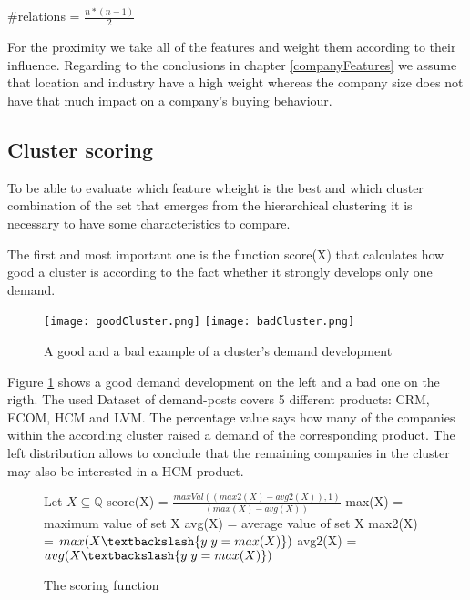 \begin{center}
  { \Large #relations \LARGE = $\frac{n*(n-1)}{2}$}
\end{center}

For the proximity we take all of the features and weight them according to their influence. Regarding to the conclusions in chapter
\ref{companyFeatures} we assume that location and industry have a high weight whereas the company size does not have that much impact
on a company's buying behaviour.


\subsection{Cluster scoring}

To be able to evaluate which feature wheight is the best and which cluster combination of the set that emerges from the hierarchical
clustering it is necessary to have some characteristics to compare.

The first and most important one is the function score(X) that calculates how good a cluster is according to the fact whether
it strongly develops only one demand.

\begin{figure}[ht]
\texttt{[image: goodCluster.png]}
\texttt{[image: badCluster.png]}
\centering
\caption{A good and a bad example of a cluster's demand development}
\label{fig:clusterDemandDevelopment}
\end{figure}

Figure \ref{fig:clusterDemandDevelopment} shows a good demand development on the left and a bad one on the rigth. The used Dataset
of demand-posts covers 5 different products: CRM, ECOM, HCM and LVM. The percentage value says how many of the companies within
the according cluster raised a demand of the corresponding product.
The left distribution allows to conclude that the remaining companies in the cluster may also be interested in a HCM product.

\begin{figure}[ht]
  {
    \Large Let $X \subseteq \mathbb{Q}$ \newline
    \Large score(X) \LARGE = $\frac{ maxVal( ( max2(X) - avg2(X) ), 1 ) }{ ( max(X) - avg(X) ) }$ \newline \newline
    \large max(X) =  maximum value of set X \newline
    \large avg(X) =  average value of set X \newline
    \large max2(X) = $ max( X \textbackslash \{ y | y = max(X)\} )$ \newline
    \large avg2(X) = $ avg( X \textbackslash \{ y | y = max(X)\} ) $ \newline
  }
  \centering
  \caption{The scoring function}
  \label{fig:scoringFunction}
\end{figure}

